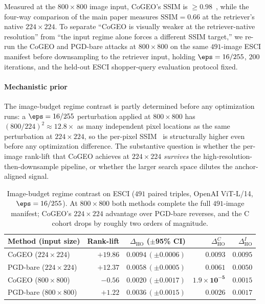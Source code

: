 Measured at the $800 \times 800$ image input, CoGEO's $\mathrm{SSIM}$ is $\geq 0.98$~\cite{wang2004ssim}, while the four-way comparison of the main paper measures $\mathrm{SSIM} = 0.66$ at the retriever's native $224 \times 224$. To separate ``CoGEO is visually weaker at the retriever-native resolution'' from ``the input regime alone forces a different SSIM target,'' we re-run the CoGEO and PGD-bare attacks at $800 \times 800$ on the same $491$-image ESCI manifest before downsampling to the retriever input, holding $\eps = 16/255$, $200$ iterations, and the held-out ESCI shopper-query evaluation protocol fixed.

\paragraph{Mechanistic prior} The image-budget regime contrast is partly determined before any optimization runs: a $\eps = 16/255$ perturbation applied at $800 \times 800$ has $(800/224)^2 \approx 12.8\times$ as many independent pixel locations as the same perturbation at $224 \times 224$, so the per-pixel SSIM~\cite{wang2004ssim} is structurally higher even before any optimization difference. The substantive question is whether the per-image rank-lift that CoGEO achieves at $224 \times 224$ \emph{survives} the high-resolution-then-downsample pipeline, or whether the larger search space dilutes the anchor-aligned signal.

\begin{table}[t]
\centering
\caption{Image-budget regime contrast on ESCI ($491$ paired triples, OpenAI ViT-L/14, $\eps = 16/255$). At $800 \times 800$ both methods complete the full $491$-image manifest; CoGEO's $224 \times 224$ advantage over PGD-bare reverses, and the C cohort drops by roughly two orders of magnitude.}
\label{sm:tab:image_budget_800}
\footnotesize
\setlength{\tabcolsep}{2pt}
\begin{tabular}{lrrrr}
\toprule
Method (input size) & Rank-lift & $\Delta_{\mathrm{HO}}$ ($\pm$95\% CI) & $\Delta_{\mathrm{HO}}^{C}$ & $\Delta_{\mathrm{HO}}^{I}$ \\
\midrule
CoGEO ($224 \times 224$)    & $+19.86$         & $0.0094\,(\pm 0.0006)$ & $0.0093$                       & $0.0095$ \\
PGD-bare ($224 \times 224$) & $+12.37$         & $0.0058\,(\pm 0.0005)$ & $0.0061$                       & $0.0050$ \\
\midrule
CoGEO ($800 \times 800$)    & $\mathbf{-0.56}$ & $0.0020\,(\pm 0.0017)$ & $\mathbf{1.9{\times}10^{-5}}$  & $0.0015$ \\
PGD-bare ($800 \times 800$) & $\mathbf{+1.22}$ & $0.0036\,(\pm 0.0015)$ & $0.0026$                       & $0.0017$ \\
\bottomrule
\end{tabular}
\end{table}

